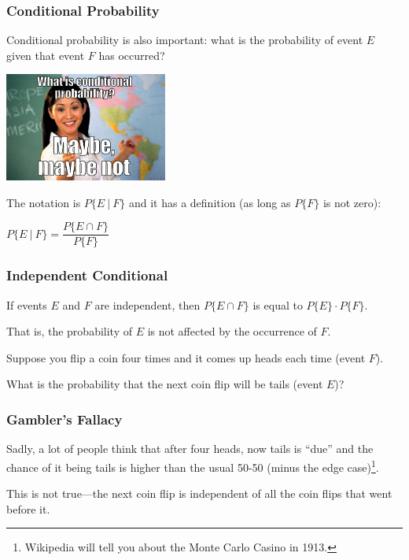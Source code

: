 \begin{frame}
\frametitle{Conditional Probability}

Conditional probability is also important: what is the probability of event $E$ given that event $F$ has occurred? 

\begin{center}
	\includegraphics[width=0.4\textwidth]{images/conditional.jpg}
\end{center}

The notation is $P\{ E~|~F \}$ and it has a definition (as long as $P\{F\}$ is not zero): 

\begin{center}
	$P\{E~|~F\} = \dfrac{P\{E \cap F\}}{P\{F\}}$
\end{center}

\end{frame}



\begin{frame}
\frametitle{Independent Conditional}

If events $E$ and $F$ are independent, then $P\{E \cap F\}$ is equal to $P\{E\} \cdot P\{F\}$. 

That is, the probability of $E$ is not affected by the occurrence of $F$. 

Suppose you flip a coin four times and it comes up heads each time (event $F$). 

What is the probability that the next coin flip will be tails (event $E$)?

\end{frame}



\begin{frame}
\frametitle{Gambler's Fallacy}

Sadly, a lot of people think that after four heads, now tails is ``due'' and the chance of it being tails is higher than the usual 50-50 (minus the edge case)\footnote{Wikipedia will tell you about the Monte Carlo Casino in 1913.}.

This is not true---the next coin flip is independent of all the coin flips that went before it.

\end{frame}




